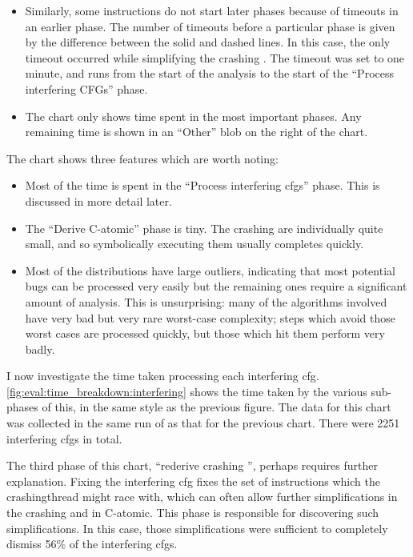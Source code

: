 \begin{itemize}
\item Similarly, some instructions do not start later phases because
  of timeouts in an earlier phase.  The number of timeouts before a
  particular phase is given by the difference between the solid and
  dashed lines.  In this case, the only timeout occurred while
  simplifying the crashing {\StateMachine}.  The timeout was set to
  one minute, and runs from the start of the analysis to the start of
  the ``Process interfering CFGs'' phase.

\item The chart only shows time spent in the most important phases.
  Any remaining time is shown in an ``Other'' blob on the right of the
  chart.
\end{itemize}

The chart shows three features which are worth noting:

\begin{itemize}
\item Most of the time is spent in the ``Process interfering
  \glspl{cfg}'' phase.  This is discussed in more detail later.
\item The ``Derive C-atomic'' phase is tiny.  The crashing
  {\StateMachines} are individually quite small, and so symbolically
  executing them usually completes quickly.
\item Most of the distributions have large outliers, indicating that
  most potential bugs can be processed very easily but the remaining
  ones require a significant amount of analysis.  This is
  unsurprising: many of the algorithms involved have very bad but very
  rare worst-case complexity; steps which avoid those worst cases are
  processed quickly, but those which hit them perform very badly.
\end{itemize}

I now investigate the time taken processing each interfering
\gls{cfg}.  \autoref{fig:eval:time_breakdown:interfering} shows the
time taken by the various sub-phases of this, in the same style as the
previous figure.  The data for this chart was collected in the same
run of {\implementation} as that for the previous chart.  There were
2251 interfering \glspl{cfg} in total.

The third phase of this chart, ``rederive crashing {\StateMachine}'',
perhaps requires further explanation.  Fixing the interfering
\gls{cfg} fixes the set of instructions which the \gls{crashingthread}
might race with, which can often allow further simplifications in the
crashing {\StateMachine} and in C-atomic.  This phase is responsible
for discovering such simplifications.  In this case, those
simplifications were sufficient to completely dismiss 56\% of the
interfering \glspl{cfg}.

